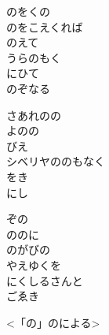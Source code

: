 \documentclass[10pt,b5j]{tarticle} %
\begin{document}
\vspace{1.5em} %
\newcommand{\linespace}{0.5em} %
\newcommand{\blocksize}{0.5\hsize} %
\begin{enumerate} %
    \begin{minipage}[c]{\blocksize}
    
        \vspace{\linespace}
        \item
        のをくの\\
        のをこえくれば\\
        のえて\\
        うらのもく\\
        にひて\\
        のぞなる
        
        \vspace{\linespace}
        \item
        さあれのの\\
        よのの\\
        びえ\\
        シベリヤののもなく\\
        をき\\
        にし
        
        \vspace{\linespace}
        \item
        ぞの\\
        ののに\\
        のがびの\\
        やえゆくを\\
        にくしるさんと\\
        ごゑき
        
        \vspace{\linespace}
        \item
        <「の」のによる>
    
    \end{minipage}
\end{enumerate} %
\end{document}
